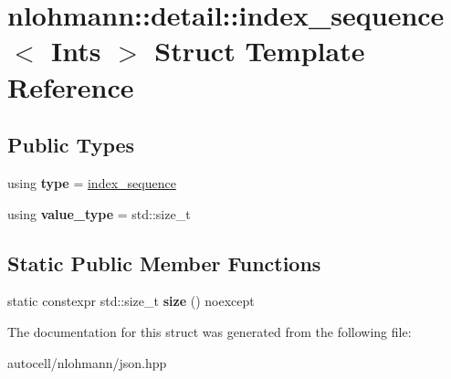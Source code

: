 \hypertarget{structnlohmann_1_1detail_1_1index__sequence}{}\section{nlohmann\+:\+:detail\+:\+:index\+\_\+sequence$<$ Ints $>$ Struct Template Reference}
\label{structnlohmann_1_1detail_1_1index__sequence}
\subsection*{Public Types}
\begin{DoxyCompactItemize}
\item 
\mbox{\label{structnlohmann_1_1detail_1_1index__sequence_a3c14c4ab277de72b166806193ff4fa10}} 
using {\bfseries type} = \mbox{\hyperlink{structnlohmann_1_1detail_1_1index__sequence}{index\+\_\+sequence}}
\item 
\mbox{\label{structnlohmann_1_1detail_1_1index__sequence_a2eca43d08fc1eb68bd5fa75b6714d21d}} 
using {\bfseries value\+\_\+type} = std\+::size\+\_\+t
\end{DoxyCompactItemize}
\subsection*{Static Public Member Functions}
\begin{DoxyCompactItemize}
\item 
\mbox{\label{structnlohmann_1_1detail_1_1index__sequence_a7ac529419787d775f52408135304b337}} 
static constexpr std\+::size\+\_\+t {\bfseries size} () noexcept
\end{DoxyCompactItemize}


The documentation for this struct was generated from the following file\+:\begin{DoxyCompactItemize}
\item 
autocell/nlohmann/json.\+hpp\end{DoxyCompactItemize}
